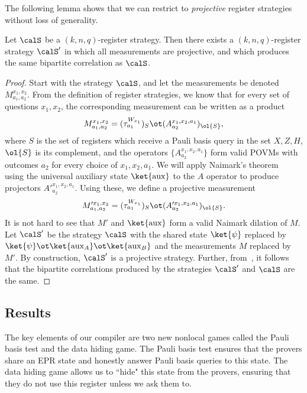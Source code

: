 \documentclass[11pt]{article}
\newcommand{\rmaux}{\mathrm{aux}}
\begin{document}
The following lemma shows that we can restrict to \emph{projective}
register strategies without loss of generality.
\begin{lemma}\label{lem:proj-suffices}
  Let $\calS$ be a $(k, n,q)$-register strategy. Then there exists a
  $(k,n,q)$-register strategy $\calS'$ in which all measurements are
  projective, and which produces the same bipartite correlation as $\calS$.
\end{lemma}
\begin{proof}
  Start with the strategy $\calS$, and let the measurements be denoted
  $M^{x_1, x_2}_{a_1, a_2}$. From the definition of register
  strategies, we know that for every set of questions $x_1, x_2$, the
  corresponding measurement can be written as a product
  \[ M^{x_1, x_2}_{a_1,a_2} = (\tau^{W_{x_1}}_{a_1})_{S} \ot (A^{x_1, x_2, a_1}_{a_2})_{\ol{S}}, \]
  where $S$ is the set of registers which receive a Pauli basis query
  in the set $X, Z, H$, $\ol{S}$ is its complement, and the operators
  $\{A^{x_1, x_2, a_1}_{a_2}\}$  form valid POVMs with outcomes $a_2$
  for every choice of $x_1, x_2, a_1$.
  We will apply Naimark's theorem~ using the
  universal auxiliary state $\ket{\rmaux}$ to the $A$ operator to produce projectors
  $A'^{x_1, x_2, a_1}_{a_2}$. Using these, we define a projective measurement
  \[ M'^{x_1, x_2}_{a_1, a_2} = (\tau^{W_{x_1}}_{a_1})_{S} \ot
    (A'^{x_1, x_2, a_1}_{a_2})_{\ol{S}}. \]
  It is not hard to see that $M'$ and $\ket{\rmaux}$ form a valid
  Naimark dilation of $M$.
  Let $\calS'$ be the strategy $\calS$ with the shared state
  $\ket{\psi}$ replaced by $\ket{\psi} \ot \ket{\rmaux_A} \ot
  \ket{\rmaux_B}$ and the measurements $M$ replaced by $M'$. By
  construction, $\calS'$ is a projective strategy. Further,
  from~, it follows that the bipartite
  correlations produced by the strategies $\calS'$ and $\calS$ are the same.
\end{proof}
\subsection{Results}\label{sec:register-results}

The key elements of our compiler are two new nonlocal games
called the Pauli basis test and the data hiding game.
The Pauli basis test ensures that the provers share an EPR state and honestly answer Pauli basis queries to this state.
The data hiding game allows us to ``hide" this state from the provers, ensuring that they do not use this register unless we ask them to.
\end{document}

